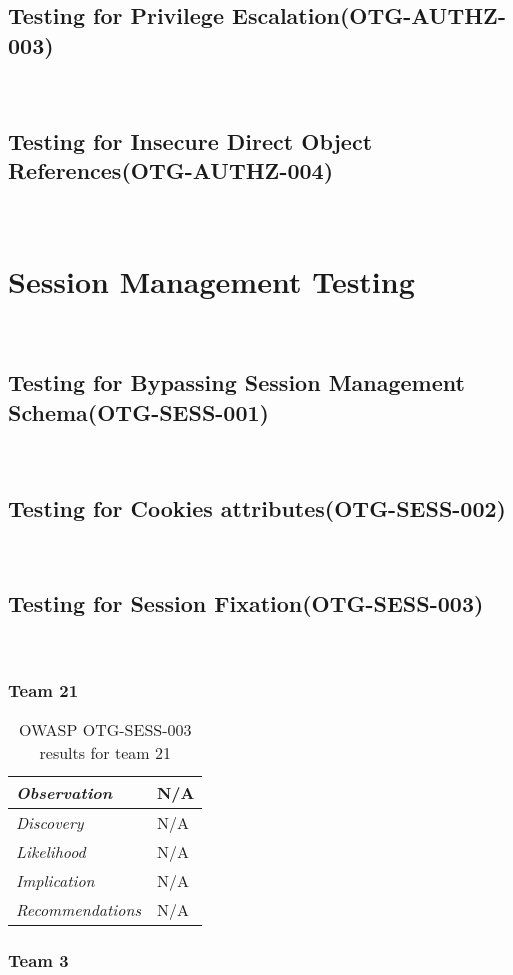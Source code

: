 \documentclass[headsepline,footsepline,footinclude=false,oneside,fontsize=11pt,paper=a4,listof=totoc,bibliography=totoc]{scrbook} %
\begin{document}
\subsection{Testing for Privilege Escalation(OTG-AUTHZ-003)}\
\pagebreak
\subsection{Testing for Insecure Direct Object References(OTG-AUTHZ-004)}\

\pagebreak
\section{Session Management Testing}\
\subsection{Testing for Bypassing Session Management Schema(OTG-SESS-001)}\
\pagebreak
\subsection{Testing for Cookies attributes(OTG-SESS-002)}\
\pagebreak
\subsection{Testing for Session Fixation(OTG-SESS-003)}\

 \subsubsection{Team 21}

 \begin{table}[H]
 	\centering
 	\begin{tabular}{l p{11cm}}
 		\textit{Observation} &  N/A\\
 		\hline
 		\textit{Discovery} &  N/A \\
 		\hline
 		\textit{Likelihood} & N/A\\
 		\hline
 		\textit{Implication} & N/A\\
 		\hline
 		\textit{Recommendations} & N/A\\
 	\end{tabular}
 	\caption{OWASP OTG-SESS-003 results for team 21}
 	\label{table:scenario2}
 \end{table}

 \subsubsection{Team 3}
\end{document}
